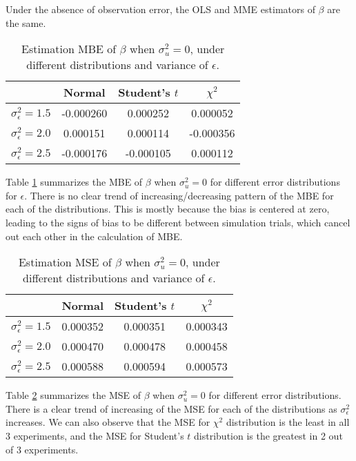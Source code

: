 \documentclass{article}
\begin{document}
Under the absence of observation error, the OLS and MME estimators of $\beta$ are the same.

\begin{table}[ht]
    \centering
    \caption{Estimation MBE of $\beta$ when $\sigma^2_u=0$, under different distributions and variance of $\epsilon$.}
    \label{Tab:MBE_absence}
    \begin{tabular}[t]{lccc}
        \hline
        &Normal&Student's $t$&$\chi^2$\\
        \hline
        $\sigma^2_\epsilon = 1.5$&-0.000260& 0.000252& 0.000052\\
        $\sigma^2_\epsilon = 2.0$& 0.000151& 0.000114&-0.000356\\
        $\sigma^2_\epsilon = 2.5$&-0.000176&-0.000105& 0.000112\\
        \hline
    \end{tabular}
\end{table}

Table \ref{Tab:MBE_absence} summarizes the MBE of $\beta$ when $\sigma^2_u=0$ for different error distributions for $\epsilon$.
There is no clear trend of increasing/decreasing pattern of the MBE for each of the distributions. 
This is mostly because the bias is centered at zero, leading to the signs of bias to be different between simulation trials, which cancel out each other in the calculation of MBE. 

\begin{table}[ht]
    \centering
    \caption{Estimation MSE of $\beta$ when $\sigma^2_u=0$, under different distributions and variance of $\epsilon$.}
    \label{Tab:MSE_absence}
    \begin{tabular}[t]{lccc}
        \hline
        &Normal&Student's $t$&$\chi^2$\\
        \hline
        $\sigma^2_\epsilon = 1.5$&0.000352&0.000351&0.000343\\
        $\sigma^2_\epsilon = 2.0$&0.000470&0.000478&0.000458\\
        $\sigma^2_\epsilon = 2.5$&0.000588&0.000594&0.000573\\
        \hline
    \end{tabular}
\end{table}

Table \ref{Tab:MSE_absence} summarizes the MSE of $\beta$ when $\sigma^2_u=0$ for different error distributions.
There is a clear trend of increasing of the MSE for each of the distributions as $\sigma^2_\epsilon$ increases. 
We can also observe that the MSE for $\chi^2$ distribution is the least in all 3 experiments, and the MSE for Student's $t$ distribution is the greatest in 2 out of 3 experiments.
\end{document}
